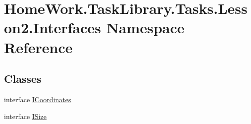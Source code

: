 \hypertarget{namespace_home_work_1_1_task_library_1_1_tasks_1_1_lesson2_1_1_interfaces}{}\section{Home\+Work.\+Task\+Library.\+Tasks.\+Lesson2.\+Interfaces Namespace Reference}
\label{namespace_home_work_1_1_task_library_1_1_tasks_1_1_lesson2_1_1_interfaces}
\subsection*{Classes}
\begin{DoxyCompactItemize}
\item 
interface \mbox{\hyperlink{interface_home_work_1_1_task_library_1_1_tasks_1_1_lesson2_1_1_interfaces_1_1_i_coordinates}{I\+Coordinates}}
\item 
interface \mbox{\hyperlink{interface_home_work_1_1_task_library_1_1_tasks_1_1_lesson2_1_1_interfaces_1_1_i_size}{I\+Size}}
\end{DoxyCompactItemize}

